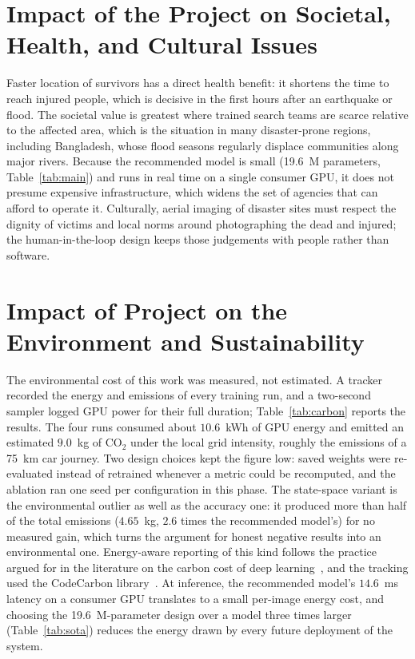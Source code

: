 \section{Impact of the Project on Societal, Health, and Cultural Issues}
Faster location of survivors has a direct health benefit: it shortens the time
to reach injured people, which is decisive in the first hours after an
earthquake or flood. The societal value is greatest where trained search teams
are scarce relative to the affected area, which is the situation in many
disaster-prone regions, including Bangladesh, whose flood seasons regularly
displace communities along major rivers. Because the recommended model is
small (19.6~M parameters, Table~\ref{tab:main}) and runs in real time on a
single consumer GPU, it does not presume expensive infrastructure, which
widens the set of agencies that can afford to operate it. Culturally, aerial
imaging of disaster sites must respect the dignity of victims and local norms
around photographing the dead and injured; the human-in-the-loop design keeps
those judgements with people rather than software.

\section{Impact of Project on the Environment and Sustainability}
The environmental cost of this work was measured, not estimated. A tracker
recorded the energy and emissions of every training run, and a two-second
sampler logged GPU power for their full duration; Table~\ref{tab:carbon}
reports the results. The four runs consumed about $10.6$~kWh of GPU energy
and emitted an estimated $9.0$~kg of CO$_2$ under the local grid intensity,
roughly the emissions of a 75~km car journey. Two design choices kept the
figure low: saved weights were re-evaluated instead of retrained whenever a
metric could be recomputed, and the ablation ran one seed per configuration
in this phase. The state-space variant is the environmental outlier as well
as the accuracy one: it produced more than half of the total emissions
($4.65$~kg, $2.6$ times the recommended model's) for no measured gain, which
turns the argument for honest negative results into an environmental one.
Energy-aware reporting of this kind follows the practice argued for in the
literature on the carbon cost of deep learning~\cite{strubell2019energy}, and
the tracking used the CodeCarbon library~\cite{codecarbon}. At inference, the
recommended model's $14.6$~ms latency on a consumer GPU translates to a small
per-image energy cost, and choosing the 19.6~M-parameter design over a model
three times larger (Table~\ref{tab:sota}) reduces the energy drawn by every
future deployment of the system.

